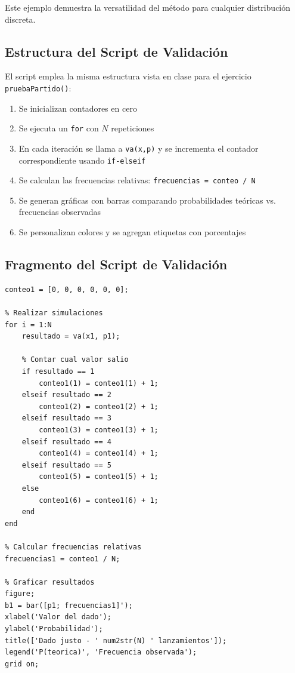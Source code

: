 \documentclass{article}
\begin{document}
    Este ejemplo demuestra la versatilidad del método para cualquier distribución discreta.
    
    \subsection*{Estructura del Script de Validación}
    
    El script emplea la misma estructura vista en clase para el ejercicio \texttt{pruebaPartido()}:
    
    \begin{enumerate}
        \item Se inicializan contadores en cero
        \item Se ejecuta un \texttt{for} con $N$ repeticiones
        \item En cada iteración se llama a \texttt{va(x,p)} y se incrementa el contador correspondiente usando \texttt{if-elseif}
        \item Se calculan las frecuencias relativas: \texttt{frecuencias = conteo / N}
        \item Se generan gráficas con barras comparando probabilidades teóricas vs. frecuencias observadas
        \item Se personalizan colores y se agregan etiquetas con porcentajes
    \end{enumerate}
    
    \subsection*{Fragmento del Script de Validación}
    
    \begin{lstlisting}[caption={Extracto del script de validación - similar a lo visto en clase}]
% Inicializar contadores
conteo1 = [0, 0, 0, 0, 0, 0];

% Realizar simulaciones
for i = 1:N
    resultado = va(x1, p1);
    
    % Contar cual valor salio
    if resultado == 1
        conteo1(1) = conteo1(1) + 1;
    elseif resultado == 2
        conteo1(2) = conteo1(2) + 1;
    elseif resultado == 3
        conteo1(3) = conteo1(3) + 1;
    elseif resultado == 4
        conteo1(4) = conteo1(4) + 1;
    elseif resultado == 5
        conteo1(5) = conteo1(5) + 1;
    else
        conteo1(6) = conteo1(6) + 1;
    end
end

% Calcular frecuencias relativas
frecuencias1 = conteo1 / N;

% Graficar resultados
figure;
b1 = bar([p1; frecuencias1]');
xlabel('Valor del dado');
ylabel('Probabilidad');
title(['Dado justo - ' num2str(N) ' lanzamientos']);
legend('P(teorica)', 'Frecuencia observada');
grid on;
    \end{lstlisting}
    
\end{document}
